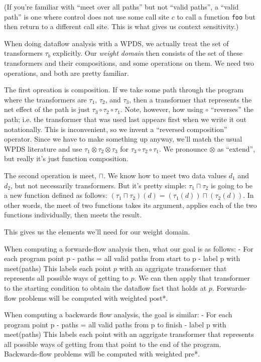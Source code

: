 \documentclass{article}
\newcommand{\Code}[1]{\texttt{#1}}
\newcommand{\meet}{\sqcap}
\newcommand{\extend}{\otimes}
\begin{document}
(If you're familiar with ``meet over all paths'' but not ``valid
paths'', a ``valid path'' is one where control does not use some call
site $c$ to call a function \Code{foo} but then return to a different
call site. This is what gives us context sensitivity.)

When doing dataflow analysis with a WPDS, we actually treat the set of
transformers $\tau_b$ explicitly. Our \emph{weight domain} then
consists of the set of these transformers and their compositions, and
some operations on them. We need two operations, and both are pretty
familiar.

The first opreation is composition. If we take some path through the
program where the transformers are $\tau_1$, $\tau_2$, and $\tau_3$,
then a transformer that represents the net effect of the path is just
$\tau_3 \circ \tau_2 \circ \tau_1$. Note, however, how using $\circ$
``reverses'' the path; i.e. the transformer that was used last appears
first when we write it out notationally. This is inconvenient, so we
invent a ``reversed composition'' operator. Since we have to make
something up anyway, we'll match the usual WPDS literature and use
$\tau_1 \extend \tau_2 \extend \tau_3$ for $\tau_3 \circ \tau_2 \circ
\tau_1$. We pronounce $\extend$ as ``extend'', but really it's just
function composition.

The second operation is meet, $\meet$. We know how to meet two data
values $d_1$ and $d_2$, but not necessarily transformers. But it's
pretty simple: $\tau_1 \meet \tau_2$ is going to be a new function
defined as follows: $(\tau_1 \meet \tau_2)(d) = (\tau_1(d)) \meet
(\tau_2(d))$. In other words, the meet of two functions takes its
argument, applies each of the two functions individually, then meets
the result.

This gives us the elements we'll need for our weight domain. 

When computing a forwards-flow analysis then, what our goal is as
follows:
    - For each program point p
        - paths = {all valid paths from start to p}
        - label p with meet(paths)
This labels each point $p$ with an aggrigate transformer that
represents all possible ways of getting to $p$. We can then apply that
transformer to the starting condition to obtain the dataflow fact that
holds at $p$. Forwards-flow problems will be computed with weighted
post*.

When computing a backwards flow analysis, the goal is similar:
    - For each program point p
        - paths = {all valid paths from p to finish}
        - label p with meet(paths)
This labels each point with an aggrigate transformer that represents
all possible ways of getting from that point to the end of the
program. Backwards-flow problems will be computed with weighted pre*.
\end{document}
